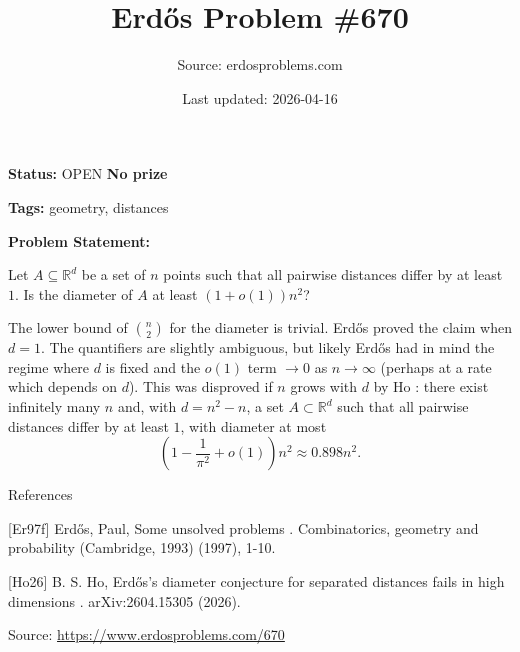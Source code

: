 \documentclass{article}
\title{Erd\H{o}s Problem \#670}
\date{Last updated: 2026-04-16}
\author{Source: erdosproblems.com}
\begin{document}
\maketitle

\noindent\textbf{Status:} OPEN \quad \textbf{No prize}

\noindent\textbf{Tags:} geometry, distances

\medskip

\noindent\textbf{Problem Statement:}

Let $A\subseteq \mathbb{R}^d$ be a set of $n$ points such that all pairwise distances differ by at least $1$. Is the diameter of $A$ at least $(1+o(1))n^2$?




The lower bound of $\binom{n}{2}$ for the diameter is trivial. Erd\H{o}s \cite{Er97f} proved the claim when $d=1$. The quantifiers are slightly ambiguous, but likely Erd\H{o}s had in mind the regime where $d$ is fixed and the $o(1)$ term $\to 0$ as $n\to \infty$ (perhaps at a rate which depends on $d$). This was disproved if $n$ grows with $d$ by Ho \cite{Ho26}: there exist infinitely many $n$ and, with $d=n^2-n$, a set $A\subset \mathbb{R}^d$ such that all pairwise distances differ by at least $1$, with diameter at most\[\left(1-\frac{1}{\pi^2}+o(1)\right)n^2\approx 0.898n^2.\]




References

[Er97f] Erd\H{o}s, Paul, Some unsolved problems . Combinatorics, geometry and probability (Cambridge, 1993) (1997), 1-10.

[Ho26] B. S. Ho, Erd\H{o}s's diameter conjecture for separated distances fails in high dimensions . arXiv:2604.15305 (2026).


\bigskip
\noindent\small{Source: \url{https://www.erdosproblems.com/670}}
\end{document}
